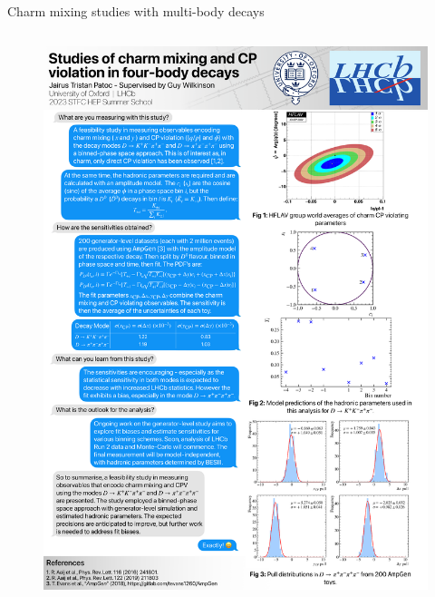 \documentclass[xcolor={dvipsnames}]{beamer}
\begin{document}
\begin{frame}{Charm mixing studies with multi-body decays}
\begin{columns}
\begin{column}{0.5\textwidth}
\begin{figure}[htb]
        \includegraphics[width=1.0\textwidth,trim={44cm 0 3cm 81cm},clip=true]{Plots/STFC_poster_Jairus.pdf}
      \end{figure}
    \end{column}
  \end{columns}
\end{frame}
\end{document}
